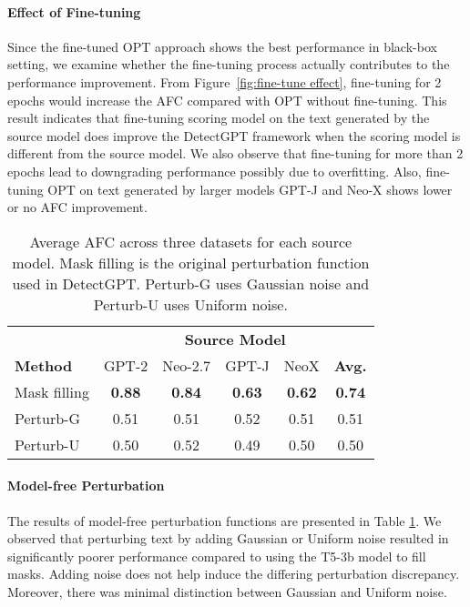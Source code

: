 \documentclass[11pt]{article}
\begin{document}
\paragraph{Effect of Fine-tuning} Since the fine-tuned OPT approach shows the best performance in black-box setting, we examine whether the fine-tuning process actually contributes to the performance improvement. From Figure~\ref{fig:fine-tune effect}, fine-tuning for 2 epochs would increase the AFC compared with OPT without fine-tuning. This result indicates that fine-tuning scoring model on the text generated by the source model does improve the DetectGPT framework when the scoring model is different from the source model. We also observe that fine-tuning for more than 2 epochs lead to downgrading performance possibly due to overfitting. Also, fine-tuning OPT on text generated by larger models GPT-J and Neo-X shows lower or no AFC improvement.

\begin{table}[h]
    \centering
    \small%
    \begin{tabular}{lccccc}
    \toprule
        &\multicolumn{5}{c}{\textbf{Source Model}} \\
        \cmidrule(lr){2-6}
         \textbf{Method} & GPT-2 & Neo-2.7 & GPT-J & NeoX & \textbf{Avg.}\\
         \midrule
        Mask filling & \textbf{0.88} & \textbf{0.84} & \textbf{0.63} & \textbf{0.62} & \textbf{0.74}\\
        \midrule
        Perturb-G & 0.51 & 0.51 & 0.52 & 0.51 & 0.51\\
        Perturb-U & 0.50 & 0.52 & 0.49 & 0.50 & 0.50\\
        \bottomrule
    \end{tabular}
    \vspace{-3mm}
    \caption{Average AFC across three datasets for each source model. Mask filling is the original perturbation function used in DetectGPT. Perturb-G uses Gaussian noise and Perturb-U uses Uniform noise.}
    \label{tab:perturb-results}
    \vspace{-5mm}
\end{table}

\paragraph{Model-free Perturbation}
The results of model-free perturbation functions are presented in Table \ref{tab:perturb-results}. We observed that perturbing text by adding Gaussian or Uniform noise resulted in significantly poorer performance compared to using the T5-3b model to fill masks. Adding noise does not help induce the differing perturbation discrepancy. Moreover, there was minimal distinction between Gaussian and Uniform noise.
\end{document}

